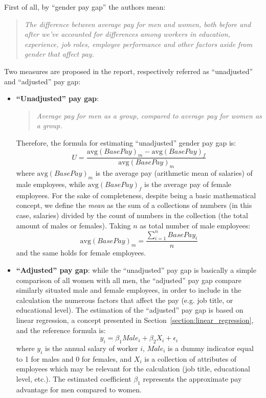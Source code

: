 First of all, by ``gender pay gap'' the authors mean:
\begin{quote}\emph{The difference between average pay for men and women, both before and after we've accounted for differences among workers in education, experience, job roles, employee performance and other factors aside from gender that affect pay.} \cite[p.~3]{chamberlain2017analyze}\end{quote}
Two measures are proposed in the report, respectively referred as ``unadjusted'' and ``adjusted'' pay gap:
\begin{itemize}
\item \textbf{``Unadjusted'' pay gap}:
\begin{quote}\emph{Average pay for men as a group, compared to average pay for women as a group.} \cite[p.~3]{chamberlain2017analyze}\end{quote}
Therefore, the formula for estimating ``unadjusted'' gender pay gap is: \[U = \frac{\mathrm{avg}(BasePay)_m - \mathrm{avg}(BasePay)_f}{\mathrm{avg}(BasePay)_m}\] where \(\mathrm{avg}(BasePay)_m\) is the average pay (arithmetic mean of salaries) of male employees, while \(\mathrm{avg}(BasePay)_f\) is the average pay of female employees.
For the sake of completeness, despite being a basic mathematical concept, we define the \textit{mean} as the sum of a collections of numbers (in this case, salaries) divided by the count of numbers in the collection (the total amount of males or females). Taking \(n\) as total number of male employees: \[\mathrm{avg}(BasePay)_m = \frac{\sum\limits_{i=1}^n BasePay_i}{n}\] and the same holds for female employees.
\item \textbf{``Adjusted'' pay gap}: while the ``unadjusted'' pay gap is basically a simple comparison of all women with all men, the ``adjusted'' pay gap compare similarly situated male and female employees, in order to include in the calculation the numerous factors that affect the pay (e.g. job title, or educational level). The estimation of the ``adjusted'' pay gap is based on linear regression, a concept presented in Section~\ref{section:linear_regression}, and the reference formula is: \[y_i = \beta_1\textit{Male}_i + \beta_2X_i + \epsilon_i\] where \(y_i\) is the annual salary of worker \(i\), \(\textit{Male}_i\) is a dummy indicator equal to 1 for males and 0 for females, and \(X_i\) is a collection of attributes of employees which may be relevant for the calculation (job title, educational level, etc.). The estimated coefficient \(\beta_1\) represents the approximate pay advantage for men compared to women.
\end{itemize}


